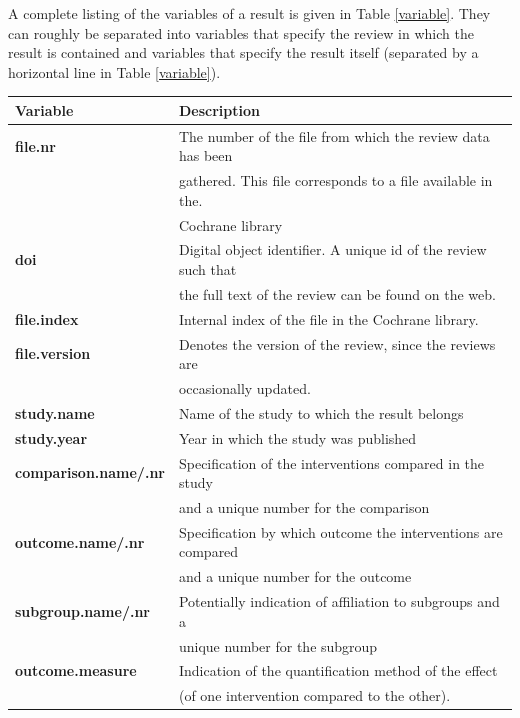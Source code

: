 \documentclass[11pt,a4paper,twoside]{book}\usepackage[]{graphicx}\usepackage[]{color}
\begin{document}
A complete listing of the variables of a result is given in Table \ref{variable}. They can roughly be separated into variables that specify the review in which the result is contained and variables that specify the result itself (separated by a horizontal line in Table \ref{variable}).

\begin{table}[ht]
  \begin{center}
    \begin{tabular}{l l}
      \textbf{Variable} & \textbf{Description}\\
      \hline
      \textbf{file.nr} & The number of the file from which the review data has been \\&gathered. This file corresponds to a file available in the. \\& Cochrane library\\
      \textbf{doi} & Digital object identifier. A unique id of the review such that  \\ &the full text of the review can be found on the web.\\
      \textbf{file.index} & Internal index of the file in the Cochrane library.\\
      \textbf{file.version} & Denotes the version of the review, since the reviews are \\ &occasionally updated.\\
      \hline
      \textbf{study.name} & Name of the study to which the result belongs\\
      \textbf{study.year} & Year in which the study was published\\
      \hline
      \textbf{comparison.name/.nr} & Specification of the interventions compared in the study  \\ &and a unique number for the comparison\\
      \textbf{outcome.name/.nr} & Specification by which outcome the interventions are compared\\ &and a unique number for the outcome\\
      \textbf{subgroup.name/.nr} & Potentially indication of affiliation to subgroups and a \\ &unique number for the subgroup\\
      \textbf{outcome.measure} & Indication of the quantification method of the effect \\ &(of one intervention compared to the other).\\

\end{tabular}
\end{center}
\end{table}
\end{document}
